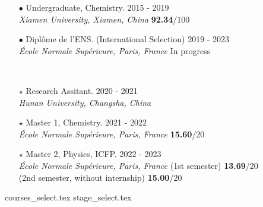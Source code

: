 \documentclass[9pt]{beamer}
\begin{document}
\begin{frame}[fragile]

	\begin{itemize}
	\setlength{\itemsep}{12pt}
	\item[$\bullet$] Undergraduate, Chemistry. \hfill 2015 - 2019 \\
		\textit{Xiamen University, Xiamen, China} \hfill \textbf{92.34}/100
		
	\item[$\bullet$] Diplôme de l'ENS. (International Selection) \hfill 2019 - 2023  \\
		\textit{École Normale Supérieure, Paris, France} \hfill In progress

	\end{itemize}
	
	\bigskip

	\begin{minipage}{0.06\linewidth}
	\textcolor{white}{Just for space}
	\end{minipage}
	\begin{minipage}{0.93\linewidth}
	\begin{itemize}
		\setlength{\itemsep}{12pt}
			
	\item[$\star$] Research Assitant. \hfill 2020 - 2021  \\
		\textit{Hunan University, Changsha, China}
		
	\item[$\star$] Master 1, Chemistry. \hfill 2021 - 2022 \\
		\textit{École Normale Supérieure, Paris, France} \hfill \textbf{15.60}/20
		
	\item[$\star$] Master 2, Physics, ICFP. \hfill 2022 - 2023 \\
		\textit{École Normale Supérieure, Paris, France}
		\hfill (1st semester) \textbf{13.69}/20 \\
	\hfill (2nd semester, without internship) \textbf{15.00}/20
	\end{itemize}
	
	\end{minipage}
	
\end{frame}






{courses_select.tex}
{stage_select.tex}
\end{document}

